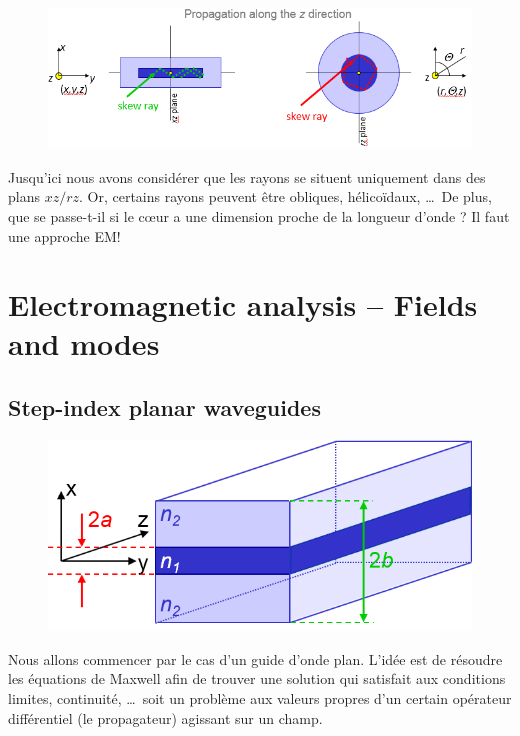\begin{figure}
	\vspace{-5mm}
	\includegraphics[scale=0.45]{ch1/image7.png}
	\end{figure}
Jusqu'ici nous avons considérer que les rayons se situent uniquement dans des plans $xz/rz$. Or, 
certains rayons peuvent être obliques, hélicoïdaux, \dots\ De plus, que se passe-t-il si le 
cœur a une dimension proche de la longueur d'onde ? Il faut une approche EM!

\section{Electromagnetic analysis – Fields and modes}
\subsection{Step-index planar waveguides}

\begin{figure}
	\vspace{-5mm}
	\includegraphics[scale=0.4]{ch1/image10.png}
	\end{figure}
Nous allons commencer par le cas d'un guide d'onde plan. L'idée est de résoudre les équations de 
Maxwell afin de trouver une solution qui satisfait aux conditions limites, continuité, \dots\ soit 
un problème aux valeurs propres d'un certain opérateur différentiel (le propagateur) agissant sur un 
champ.\\

